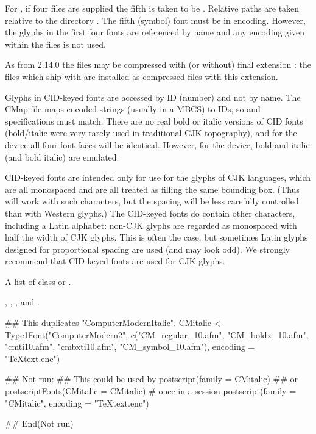 \begin{Details}\relax
For , if four  files are supplied the
fifth is taken to be .  Relative paths are taken
relative to the directory .
The fifth (symbol) font must be in  encoding.
However, the glyphs in the first four fonts are referenced by name
and any encoding given within the  files is not used.

As from \R{} 2.14.0 the  files may be compressed with (or
without) final extension : the files which ship with \R{} are
installed as compressed files with this extension.

Glyphs in CID-keyed fonts are accessed by ID (number) and not by name.
The CMap file maps encoded strings (usually in a MBCS) to IDs, so
 and  specifications must match.  There
are no real bold or italic versions of CID fonts (bold/italic were
very rarely used in traditional CJK topography), and for the
 device all four font faces will be identical.
However, for the  device, bold and italic (and
bold italic) are emulated.

CID-keyed fonts are intended only for use for the glyphs of CJK
languages, which are all monospaced and are all treated as filling the
same bounding box.  (Thus  will work with such
characters, but the spacing will be less carefully controlled than
with Western glyphs.)  The CID-keyed fonts do contain other
characters, including a Latin alphabet:  non-CJK glyphs are regarded
as monospaced with half the width of CJK glyphs.  This is often the
case, but sometimes Latin glyphs designed for proportional spacing are
used (and may look odd).  We strongly recommend that CID-keyed fonts
are  used for CJK glyphs.
\end{Details}
%
\begin{Value}
A list of class  or .
\end{Value}
%
\begin{SeeAlso}\relax
{}, ,
, and .
\end{SeeAlso}
%
\begin{Examples}
\begin{ExampleCode}
## This duplicates "ComputerModernItalic".
CMitalic <- Type1Font("ComputerModern2",
                      c("CM_regular_10.afm", "CM_boldx_10.afm",
                        "cmti10.afm", "cmbxti10.afm",
                        "CM_symbol_10.afm"),
                      encoding = "TeXtext.enc")

## Not run: 
## This could be used by
postscript(family = CMitalic)
## or
postscriptFonts(CMitalic = CMitalic)  # once in a session
postscript(family = "CMitalic", encoding = "TeXtext.enc")

## End(Not run)
\end{ExampleCode}
\end{Examples}
